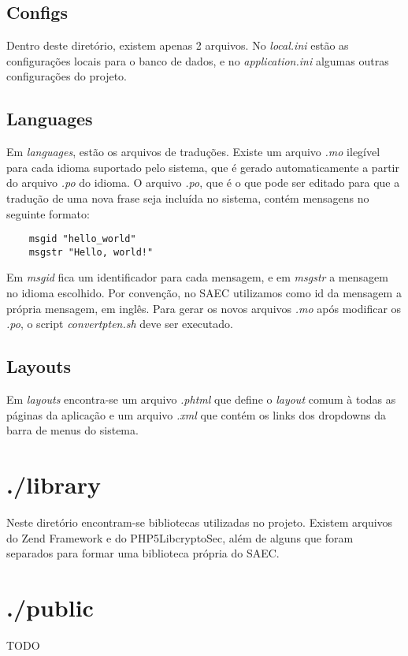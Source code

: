 \subsection{Configs}
Dentro deste diretório, existem apenas 2 arquivos. No \textit{local.ini} estão as configurações locais para o banco de dados, e no \textit{application.ini} algumas outras configurações do projeto.

\subsection{Languages}
Em \textit{languages}, estão os arquivos de traduções. Existe um arquivo \textit{.mo} ilegível para cada idioma suportado pelo sistema, que é gerado automaticamente a partir do arquivo \textit{.po} do idioma. O arquivo \textit{.po}, que é o que pode ser editado para que a tradução de uma nova frase seja incluída no sistema, contém mensagens no seguinte formato:

\begin{lstlisting}
    msgid "hello_world"
    msgstr "Hello, world!"
\end{lstlisting}

Em \textit{msgid} fica um identificador para cada mensagem, e em \textit{msgstr} a mensagem no idioma escolhido. Por convenção, no SAEC utilizamos como id da mensagem a própria mensagem, em inglês. Para gerar os novos arquivos \textit{.mo} após modificar os \textit{.po}, o script \textit{convertpten.sh} deve ser executado.

\subsection{Layouts}
Em \textit{layouts} encontra-se um arquivo \textit{.phtml} que define o \textit{layout} comum à todas as páginas da aplicação e um arquivo \textit{.xml} que contém os links dos dropdowns da barra de menus do sistema.


\section{./library}
Neste diretório encontram-se bibliotecas utilizadas no projeto. Existem arquivos do Zend Framework e do PHP5LibcryptoSec, além de alguns que foram separados para formar uma biblioteca própria do SAEC.


\section{./public}
TODO

